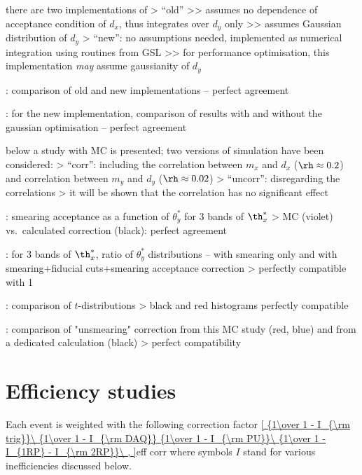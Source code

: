 \> there are two implementations of 
\>> ``old''
\>>> assumes no dependence of acceptance condition of $d_x$, thus integrates over $d_y$ only
\>>> assumes Gaussian distribution of $d_y$
\>> ``new'': no assumptions needed, implemented as numerical integration using routines from GSL
\>>> for performance optimisation, this implementation {\it may} assume gaussianity of $d_y$

\>  : comparison of old and new implementations -- perfect agreement

\>  : for the new implementation, comparison of results with and without the gaussian optimisation -- perfect agreement

\> below a study with MC is presented; two versions of simulation have been considered:
\>> ``corr'': including the correlation between $m_x$ and $d_x$ ($\rh \approx 0.2$) and correlation between $m_y$ and $d_y$ ($\rh\approx 0.02$)
\>> ``uncorr'': disregarding the correlations
\>> it will be shown that the correlation has no significant effect

\>  : smearing acceptance as a function of $\theta^*_y$ for 3 bands of $\th^*_x$
\>> MC (violet) vs.~calculated correction (black): perfect agreement

\>  : for 3 bands of $\th^*_x$, ratio of $\theta^*_y$ distributions -- with smearing only and with smearing+fiducial cuts+smearing acceptance correction
\>> perfectly compatible with 1

\>  : comparison of $t$-distributions
\>> black and red histograms perfectly compatible

\>  : comparison of "unsmearing" correction from this MC study (red, blue) and from a dedicated calculation (black)
\>> perfect compatibility


\section{Efficiency studies}

\vskip3mm
Each event is weighted with the following correction factor
\eqref{
	{1\over 1 - I_{\rm trig}}\ 
	{1\over 1 - I_{\rm DAQ}}
	{1\over 1 - I_{\rm PU}}\ 
	{1\over 1 - I_{1RP} - I_{\rm 2RP}}\ ,
}{eff corr}
where symbols $I$ stand for various inefficiencies discussed below.

